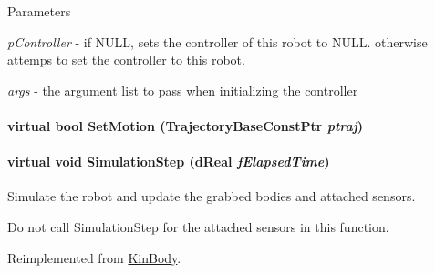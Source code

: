 \begin{DoxyParams}{Parameters}
\item[{\em pController}]-\/ if NULL, sets the controller of this robot to NULL. otherwise attemps to set the controller to this robot. \item[{\em args}]-\/ the argument list to pass when initializing the controller \end{DoxyParams}
\hypertarget{classOpenRAVE_1_1RobotBase_a53f7fcf5ff3f270a12fd9714d760bc58}{
\paragraph[{SetMotion}]{\setlength{\rightskip}{0pt plus 5cm}virtual bool SetMotion (TrajectoryBaseConstPtr {\em ptraj})}\hfill}
\label{classOpenRAVE_1_1RobotBase_a53f7fcf5ff3f270a12fd9714d760bc58}
\hypertarget{classOpenRAVE_1_1RobotBase_ab51d371d29d7947197b90d8e915de00f}{
\paragraph[{SimulationStep}]{\setlength{\rightskip}{0pt plus 5cm}virtual void SimulationStep (dReal {\em fElapsedTime})}\hfill}
\label{classOpenRAVE_1_1RobotBase_ab51d371d29d7947197b90d8e915de00f}


Simulate the robot and update the grabbed bodies and attached sensors. 

Do not call SimulationStep for the attached sensors in this function. 

Reimplemented from \hyperlink{classOpenRAVE_1_1KinBody_ab51d371d29d7947197b90d8e915de00f}{KinBody}.



